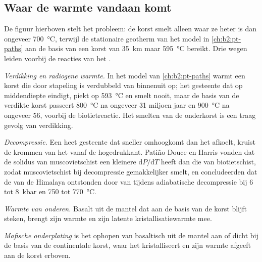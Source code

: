 \subsection*{Waar de warmte vandaan komt}

De figuur hierboven stelt het probleem: de korst smelt alleen waar ze heter is dan ongeveer
\qty{700}{\celsius}, terwijl de stationaire geotherm van het model in \cref{ch:b2:pt-paths}
aan de basis van een korst van \qty{35}{km} maar \qty{595}{\celsius} bereikt. Drie wegen leiden
voorbij de reacties van het .

\emph{Verdikking en radiogene warmte.} In het model van \cref{ch:b2:pt-paths} warmt een korst
die door stapeling is verdubbeld van binnenuit op; het gesteente dat op middendiepte eindigt, piekt op
\qty{593}{\celsius} en smelt nooit, maar de basis van de verdikte korst passeert
\qty{800}{\celsius} na ongeveer 31 miljoen jaar en \qty{900}{\celsius} na ongeveer 56, voorbij
de biotietreactie. Het smelten van de onderkorst is een traag gevolg van verdikking.

\emph{Decompressie.} Een heet gesteente dat sneller omhoogkomt dan het afkoelt, kruist de
krommen van het  vanaf de hogedrukkant. Patiño Douce en Harris vonden dat
de solidus van muscovietschist een kleinere $\mathrm{d}P/\mathrm{d}T$ heeft dan die van
biotietschist, zodat muscovietschist bij decompressie gemakkelijker smelt, en
concludeerden dat de  van de Himalaya ontstonden door  van 
tijdens adiabatische decompressie bij 6 tot \qty{8}{kbar} en 750 tot \qty{770}{\celsius}.

\emph{Warmte van onderen.} Basalt uit de mantel dat aan de basis van de korst blijft steken, brengt
zijn warmte en zijn latente kristallisatiewarmte mee.

\begin{definition}\label{def:b2:crustal-melting:underplating}
\emph{Mafische onderplating} is het ophopen van basaltisch
 uit de mantel aan of dicht bij de basis van de continentale korst, waar het kristalliseert en
zijn warmte afgeeft aan de korst erboven.
\end{definition}

